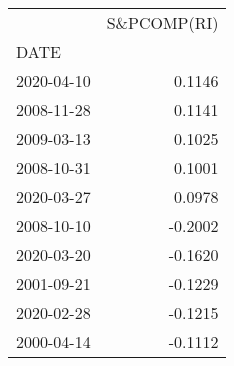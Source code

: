 \begin{tabular}{lr}
\toprule
{} &  S\&PCOMP(RI) \\
DATE       &              \\
\midrule
2020-04-10 &       0.1146 \\
2008-11-28 &       0.1141 \\
2009-03-13 &       0.1025 \\
2008-10-31 &       0.1001 \\
2020-03-27 &       0.0978 \\
2008-10-10 &      -0.2002 \\
2020-03-20 &      -0.1620 \\
2001-09-21 &      -0.1229 \\
2020-02-28 &      -0.1215 \\
2000-04-14 &      -0.1112 \\
\bottomrule
\end{tabular}
